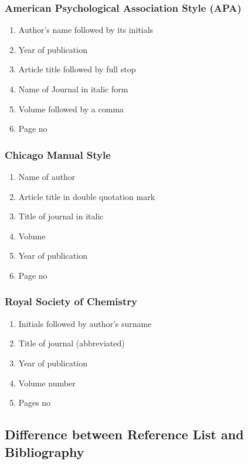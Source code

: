 \documentclass{article}
\begin{document}
\subsubsection{American Psychological Association Style (APA)}

\begin{enumerate}
    \item Author’s name followed by its initials
    \item Year of publication
    \item Article title followed by full stop
    \item Name of Journal in italic form
    \item Volume followed by a comma
    \item Page no
\end{enumerate}

\subsubsection{Chicago Manual Style}

\begin{enumerate}
    \item Name of author
    \item Article title in double quotation mark
    \item Title of journal in italic
    \item Volume
    \item Year of publication
    \item Page no
\end{enumerate}

\subsubsection{Royal Society of Chemistry}

\begin{enumerate}
    \item Initials followed by author’s surname
    \item Title of journal (abbreviated)
    \item Year of publication
    \item Volume number
    \item Pages no
\end{enumerate}

\subsection{Difference between Reference List and Bibliography}
\end{document}
